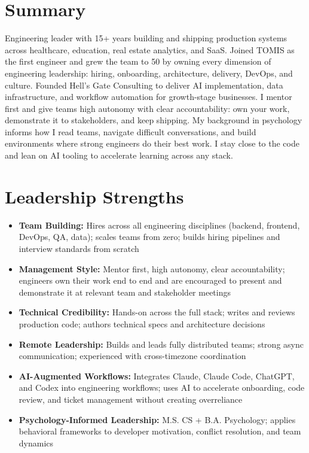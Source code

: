 \documentclass[10pt]{article}
\begin{document}
\section*{Summary}
Engineering leader with 15+ years building and shipping production systems across healthcare, education, real estate analytics, and SaaS. Joined TOMIS as the first engineer and grew the team to 50 by owning every dimension of engineering leadership: hiring, onboarding, architecture, delivery, DevOps, and culture. Founded Hell's Gate Consulting to deliver AI implementation, data infrastructure, and workflow automation for growth-stage businesses. I mentor first and give teams high autonomy with clear accountability: own your work, demonstrate it to stakeholders, and keep shipping. My background in psychology informs how I read teams, navigate difficult conversations, and build environments where strong engineers do their best work. I stay close to the code and lean on AI tooling to accelerate learning across any stack.


\section*{Leadership Strengths}
\begin{itemize}[leftmargin=*]
  \item \textbf{Team Building:} Hires across all engineering disciplines (backend, frontend, DevOps, QA, data); scales teams from zero; builds hiring pipelines and interview standards from scratch
  \item \textbf{Management Style:} Mentor first, high autonomy, clear accountability; engineers own their work end to end and are encouraged to present and demonstrate it at relevant team and stakeholder meetings
  \item \textbf{Technical Credibility:} Hands-on across the full stack; writes and reviews production code; authors technical specs and architecture decisions
  \item \textbf{Remote Leadership:} Builds and leads fully distributed teams; strong async communication; experienced with cross-timezone coordination
  \item \textbf{AI-Augmented Workflows:} Integrates Claude, Claude Code, ChatGPT, and Codex into engineering workflows; uses AI to accelerate onboarding, code review, and ticket management without creating overreliance
  \item \textbf{Psychology-Informed Leadership:} M.S. CS + B.A. Psychology; applies behavioral frameworks to developer motivation, conflict resolution, and team dynamics
\end{itemize}
\end{document}
